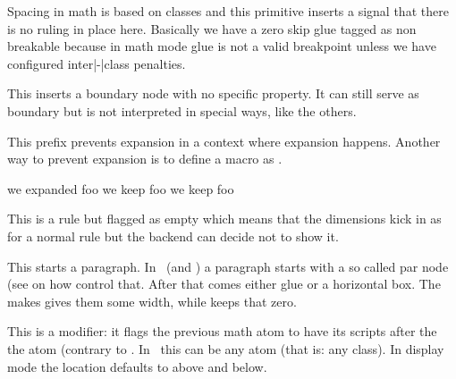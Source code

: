 \stopnewprimitive

\startnewprimitive[title={\prm {noatomruling}}]

Spacing in math is based on classes and this primitive inserts a signal that
there is no ruling in place here. Basically we have a zero skip glue tagged as
non breakable because in math mode glue is not a valid breakpoint unless we have
configured inter|-|class penalties.

\stopnewprimitive

\startnewprimitive[title={\prm {noboundary}}]

This inserts a boundary node with no specific property. It can still serve as
boundary but is not interpreted in special ways, like the others.

\stopnewprimitive

\startoldprimitive[title={\prm {noexpand}}]

This prefix prevents expansion in a context where expansion happens. Another way
to prevent expansion is to define a macro as .

\startbuffer
          \def\foo{foo} \edef\oof{we expanded      \foo} \meaning\oof
          \def\foo{foo} \edef\oof{we keep \noexpand\foo} \meaning\oof
\protected\def\foo{foo} \edef\oof{we keep          \foo} \meaning\oof
\stopbuffer

\typebuffer

\startlines
\getbuffer
\stoplines

\stopoldprimitive

\startnewprimitive[title={\prm {nohrule}}]

This is a rule but flagged as empty which means that the dimensions kick in as
for a normal rule but the backend can decide not to show it.

\stopnewprimitive

\startoldprimitive[title={\prm {noindent}}]

This starts a paragraph. In \LUATEX\ (and \LUAMETATEX) a paragraph starts with a
so called par node (see  on how control that. After that comes
either  glue or a horizontal box. The  makes gives
them some width, while  keeps that zero.

\stopoldprimitive

\startoldprimitive[title={\prm {nolimits}}]

This is a modifier: it flags the previous math atom to have its scripts after the
the atom (contrary to . In \LUAMETATEX\ this can be any atom (that
is: any class). In display mode the location defaults to above and below.

